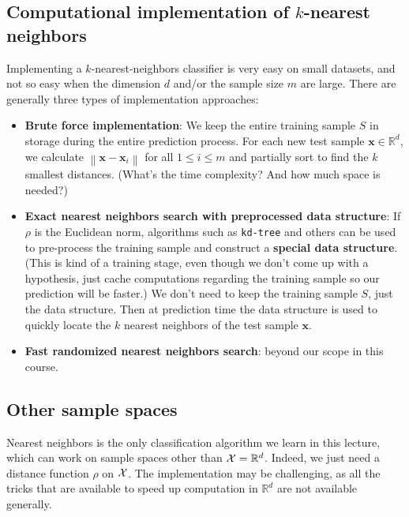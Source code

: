\documentclass[11pt]{article}
\newcommand{\norm}[1]{\left\| #1\right\|}
\newcommand{\R}{\ensuremath{\mathbb{R}}}
\newcommand{\VV}[1]{\mathbf{#1}}
\begin{document}
\subsection{Computational implementation of $k$-nearest neighbors}

Implementing a $k$-nearest-neighbors classifier is very easy on small datasets,
and not so easy when the dimension $d$ and/or the sample size $m$ are large.
There are generally three types of implementation approaches:

\begin{itemize}
  \item {\bf Brute force implementation}: We keep the entire training sample $S$
    in storage during the entire prediction process. For each new test sample
    $\VV{x}\in\R^d$, we calculate $\norm{\VV{x}-\VV{x}_i}$ for all $1\leq i\leq
    m$ and partially sort to find the $k$ smallest distances. (What's the time
    complexity? And how much space is needed?)
  \item {\bf Exact nearest neighbors search with preprocessed data structure}:
    If $\rho$ is the Euclidean norm,
    algorithms such as {\tt kd-tree} and others can be used to pre-process the
    training sample and construct a {\bf special data structure}. (This is kind of a
      training stage, even though we don't come up with a hypothesis, just
      cache computations regarding the training sample so our prediction will be
    faster.) We don't need to keep the training sample $S$, just the data
    structure. Then at prediction time the data structure is used to quickly
    locate the $k$ nearest neighbors of the test sample $\VV{x}$.
  \item {\bf Fast randomized nearest neighbors search}: 
    beyond our scope in this course.
\end{itemize}



\subsection{Other sample spaces}

Nearest neighbors is the only classification algorithm we learn in this lecture,
which can work on sample spaces other than $\mathcal{X}=\mathbb{R}^d$. Indeed, we just need a
distance function $\rho$ on $\mathcal{X}$. The implementation may be challenging, as all
the tricks that are available to speed up computation in $\R^d$ are not
available generally. 
\end{document}
